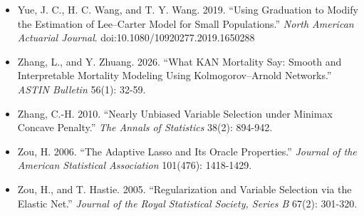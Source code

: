 \documentclass[UTF8, fontset=macnew, a4paper, 12pt]{ctexart}
\begin{document}
\begin{itemize}[leftmargin=2em, label={}, itemsep=3pt]
        Risks Using a Principal Component Approach: A Comparison with Existing
        Stochastic Mortality Models.''
        \textit{Insurance: Mathematics and Economics} 46(1): 254-270.
  \item[] Yue, J. C., H. C. Wang, and T. Y. Wang. 2019. ``Using Graduation to
        Modify the Estimation of Lee--Carter Model for Small Populations.''
        \textit{North American Actuarial Journal}.
        doi:10.1080/10920277.2019.1650288
  \item[] Zhang, L., and Y. Zhuang. 2026. ``What KAN Mortality Say: Smooth and
        Interpretable Mortality Modeling Using Kolmogorov--Arnold Networks.''
        \textit{ASTIN Bulletin} 56(1): 32-59.
  \item[] Zhang, C.-H. 2010. ``Nearly Unbiased Variable Selection under
        Minimax Concave Penalty.'' \textit{The Annals of Statistics}
        38(2): 894-942.
  \item[] Zou, H. 2006. ``The Adaptive Lasso and Its Oracle Properties.''
        \textit{Journal of the American Statistical Association}
        101(476): 1418-1429.
  \item[] Zou, H., and T. Hastie. 2005. ``Regularization and Variable Selection
        via the Elastic Net.'' \textit{Journal of the Royal Statistical
        Society, Series B} 67(2): 301-320.
\end{itemize}
\end{document}
